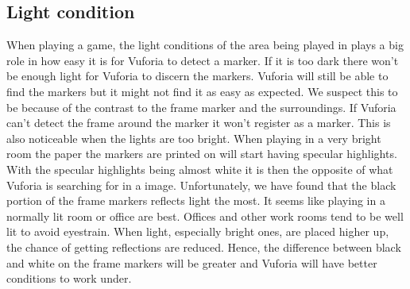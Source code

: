 \subsection{Light condition}
When playing a game, the light conditions of the area being played in plays a big role in how easy it is for Vuforia to detect a marker.
If it is too dark there won't be enough light for Vuforia to discern the markers. 
Vuforia will still be able to find the markers but it might not find it as easy as expected.
We suspect this to be because of the contrast to the frame marker and the surroundings. 
If Vuforia can't detect the frame around the marker it won't register as a marker.
This is also noticeable when the lights are too bright.
When playing in a very bright room the paper the markers are printed on will start having specular highlights.
With the specular highlights being almost white it is then the opposite of what Vuforia is searching for in a image.
Unfortunately, we have found that the black portion of the frame markers reflects light the most.
It seems like playing in a normally lit room or office are best. Offices and
other work rooms tend to be well lit to avoid eyestrain. When light, especially
bright ones, are placed higher up, the chance of getting reflections are reduced.
Hence, the difference between black and white on the frame markers will be
greater and Vuforia will have better conditions to work under.